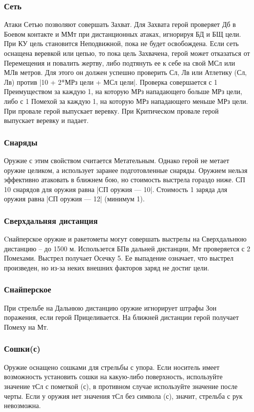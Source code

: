 \subsubsection{Сеть} Атаки Сетью позволяют совершать Захват. Для Захвата герой проверяет Дб в Боевом контакте и ММт при дистанционных атаках, игнорируя БД и БЩ цели. При КУ цель становится Неподвижной, пока не будет освобождена.
\newline Если сеть оснащена веревкой или цепью, то пока цель Захвачена, герой может отказаться от Перемещения и повалить жертву, либо подтянуть ее к себе на свой МСл или МЛв метров.  Для этого он должен успешно проверить Сл, Лв или Атлетику (Сл, Лв) против |10 + 2*МРз цели + МСл цели|. 
\newline Проверка совершается с 1 Преимуществом за каждую 1, на которую МРз нападающего больше МРз цели, либо с 1 Помехой за каждую 1, на которую МРз нападающего меньше МРз цели. При провале герой выпускает веревку. При Критическом провале герой выпускает веревку и падает. 
\subsubsection{Снаряды} Оружие с этим свойством считается Метательным. Однако герой не метает оружие целиком, а использует заранее подготовленные снаряды. Оружием нельзя эффективно атаковать в ближнем бою, но стоимость выстрела гораздо ниже. СП 10 снарядов для оружия равна |СП оружия — 10|. Стоимость 1 заряда для оружия равна |СП оружия — 12| (минимум 1). 
\subsubsection{Сверхдальняя дистанция} Cнайперское оружие и ракетометы могут совершать выстрелы на Сверхдальнюю дистанцию – до 1500 м. Использется БПв дальней дистанции, Мт проверяется с 2 Помехами. Выстрел получает Осечку 5. Ее выпадение означает, что выстрел произведен, но из-за неких внешних факторов заряд не достиг цели.
\subsubsection{Снайперское} При стрельбе на Дальнюю дистанцию оружие игнорирует штрафы Зон поражения, если герой Прицеливается. На ближней дистанции герой получает Помеху на Мт.
\subsubsection{Сошки(с)} Оружие оснащено сошками для стрельбы с упора. Если носитель имеет возможность установить сошки на какую-либо поверхность, используйте значение тСл с пометкой (с), в противном случае используйте значение после черты. Если у оружия нет значения тСл без символа (с), значит, стрельба с рук невозможна.
